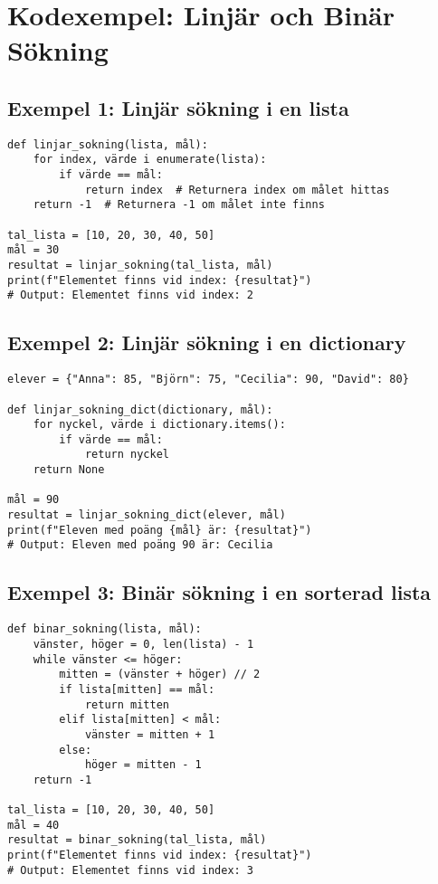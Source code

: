 \section{Kodexempel: Linjär och Binär Sökning}
\label{examples:search}
\subsection*{Exempel 1: Linjär sökning i en lista}

\begin{lstlisting}[title=Linjär sökning i en lista]
def linjar_sokning(lista, mål):
    for index, värde i enumerate(lista):
        if värde == mål:
            return index  # Returnera index om målet hittas
    return -1  # Returnera -1 om målet inte finns

tal_lista = [10, 20, 30, 40, 50]
mål = 30
resultat = linjar_sokning(tal_lista, mål)
print(f"Elementet finns vid index: {resultat}")
# Output: Elementet finns vid index: 2
\end{lstlisting}

\subsection*{Exempel 2: Linjär sökning i en dictionary}

\begin{lstlisting}[title=Linjär sökning i en dictionary]
elever = {"Anna": 85, "Björn": 75, "Cecilia": 90, "David": 80}

def linjar_sokning_dict(dictionary, mål):
    for nyckel, värde i dictionary.items():
        if värde == mål:
            return nyckel
    return None

mål = 90
resultat = linjar_sokning_dict(elever, mål)
print(f"Eleven med poäng {mål} är: {resultat}")
# Output: Eleven med poäng 90 är: Cecilia
\end{lstlisting}

\subsection*{Exempel 3: Binär sökning i en sorterad lista}

\begin{lstlisting}[title=Binär sökning i en sorterad lista]
def binar_sokning(lista, mål):
    vänster, höger = 0, len(lista) - 1
    while vänster <= höger:
        mitten = (vänster + höger) // 2
        if lista[mitten] == mål:
            return mitten
        elif lista[mitten] < mål:
            vänster = mitten + 1
        else:
            höger = mitten - 1
    return -1

tal_lista = [10, 20, 30, 40, 50]
mål = 40
resultat = binar_sokning(tal_lista, mål)
print(f"Elementet finns vid index: {resultat}")
# Output: Elementet finns vid index: 3
\end{lstlisting}

